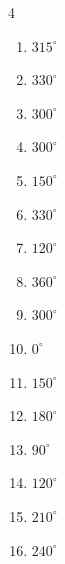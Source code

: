 \begin{multicols}{4}
\begin{enumerate}
  \item $\displaystyle 315^{\circ}$

  \item $\displaystyle 330^{\circ}$

  \item $\displaystyle 300^{\circ}$

  \item $\displaystyle 300^{\circ}$

  \item $\displaystyle 150^{\circ}$

  \item $\displaystyle 330^{\circ}$

  \item $\displaystyle 120^{\circ}$

  \item $\displaystyle 360^{\circ}$
        \phantom{$\displaystyle =2\pi$}

  \item $\displaystyle 300^{\circ}$

  \item $\displaystyle 0^{\circ}$
        \phantom{$\displaystyle =0$}

  \item $\displaystyle 150^{\circ}$

  \item $\displaystyle 180^{\circ}$
        \phantom{$\displaystyle =\pi$}

  \item $\displaystyle 90^{\circ}$

  \item $\displaystyle 120^{\circ}$

  \item $\displaystyle 210^{\circ}$

  \item $\displaystyle 240^{\circ}$


\end{enumerate}
\end{multicols}
